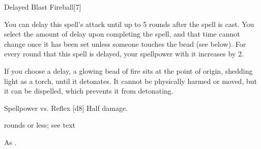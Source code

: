 \begin{spellsection}{Delayed Blast Fireball}[7]
    \begin{spellheader}
    \end{spellheader}
    \begin{spellcontent}
        \begin{spelltargetinginfo}
        \end{spelltargetinginfo}
        \begin{spelleffects}
            \spellspecial You can delay this spell's attack until up to 5 rounds after the spell is cast. You select the amount of delay upon completing the spell, and that time cannot change once it has been set unless someone touches the bead (see below). For every round that this spell is delayed, your spellpower with it increases by 2.

            If you choose a delay, a glowing bead of fire sits at the point of origin, shedding light as a torch, until it detonates. It cannot be physically harmed or moved, but it can be dispelled, which prevents it from detonating.
            \begin{spellattack}{Spellpower vs. Reflex}
                \spellsuccess {}[d8]
                \spellfailure Half damage.
            \end{spellattack}
             rounds or less; see text
        \end{spelleffects}
    \end{spellcontent}
    \begin{spellfooter}
        \spellnotes As .
        \miscastyou
    \end{spellfooter}
\end{spellsection}

